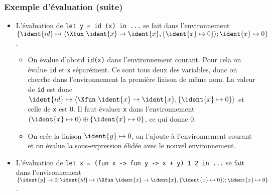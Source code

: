 %
\begin{frame}[containsverbatim]
\frametitle{Exemple d'évaluation (suite)}

\begin{itemize}

  \item L'évaluation de {\small \verb|let y = id (x) in ...|} se fait
    dans l'environnement $\{\ident{id} \mapsto \langle\Xfun \,\,
    \ident{x} \rightarrow \ident{x}, \{\ident{x} \mapsto 0\}\rangle;
    \ident{x} \mapsto 0\}$.
  \begin{itemize}

    \item On évalue d'abord \verb|id(x)| dans l'environnement
      courant. Pour cela on évalue \texttt{id} et \texttt{x}
      séparément. Ce sont tous deux des variables, donc on cherche
      dans l'environnement la première liaison de même nom. La valeur
      de \texttt{id} est donc $\ident{id} \mapsto \langle\Xfun \,\,
      \ident{x} \rightarrow \ident{x}, \{\ident{x} \mapsto 0\}\rangle$
      et celle de \texttt{x} est 0. Il faut évaluer \texttt{x} dans
      l'environnement $(\ident{x} \mapsto 0) \oplus \{\ident{x}
      \mapsto 0\}$, ce qui donne 0.

    \item On crée la liaison $\ident{y} \mapsto 0$, on l'ajoute à
    l'environnement courant et on évalue la sous-expression élidée
    avec le nouvel environnement.
 
  \end{itemize}

  \item L'évaluation de {\small
    \verb|let x = (fun x -> fun y -> x + y) 1 2 in ...|} se fait dans
    l'environnement $\{\ident{y} \mapsto 0; \ident{id} \mapsto
    \langle\Xfun \,\, \ident{x} \rightarrow \ident{x}, \{\ident{x}
    \mapsto 0\}\rangle; \ident{x} \mapsto 0\}$.

\end{itemize}

\end{frame}

